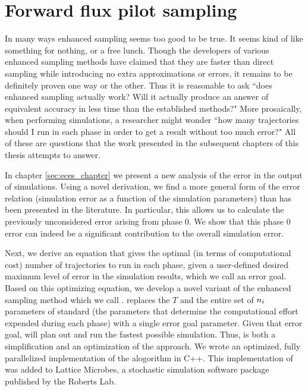 \section{Forward flux pilot sampling}\label{sec:intro_ffpilot}
In many ways enhanced sampling seems too good to be true. It seems kind of like something for nothing, or a free lunch. Though the developers of various enhanced sampling methods have claimed that they are faster than direct sampling while introducing no extra approximations or errors\supercite{Zhang:2010kfa,Allen:2006ch}, it remains to be definitely proven one way or the other. Thus it is reasonable to ask ``does enhanced sampling actually work? Will it actually produce an answer of equivalent accuracy in less time than the established methods?" More prosaically, when performing  simulations, a researcher might wonder ``how many trajectories should I run in each phase in order to get a result without too much error?" All of these are questions that the work presented in the subsequent chapters of this thesis attempts to answer.

In chapter \ref{sec:eces_chapter} we present a new analysis of the error in the output of  simulations. Using a novel derivation, we find a more general form of the  error relation (\ie simulation error as a function of the simulation parameters) than has been presented in the literature\supercite{Allen:2006ch,Borrero:2008il,Allen:2009kb}. In particular, this allows us to calculate the previously unconsidered error arising from phase $0$. We show that this phase $0$ error can indeed be a significant contribution to the overall simulation error.

Next, we derive an equation that gives the optimal (in terms of computational cost) number of trajectories to run in each phase, given a user-defined desired maximum level of error in the simulation results, which we call an error goal. Based on this optimizing equation, we develop a novel variant of the  enhanced sampling method which we call \supercite{Klein:2018dd}.  replaces the $T$ and the entire set of $n_{i}$ parameters of standard  (\ie the parameters that determine the computational effort expended during each phase) with a single error goal parameter. Given that error goal,  will plan out and run the fastest possible  simulation. Thus,  is both a simplification and an optimization of the  approach. We wrote an optimized, fully parallelized implementation of the  alogorithm in C++. This implementation of  was added to Lattice Microbes\supercite{Roberts:2013cu}, a stochastic simulation software package published by the Roberts Lab.

